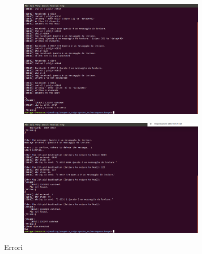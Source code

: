 \begin{figure}
\centering
\begin{subfigure}[b]{0.8\textwidth}
\includegraphics[width=\textwidth]{screenmsg/16_server}
\caption{}
\end{subfigure}
\begin{subfigure}[b]{0.8\textwidth}
\includegraphics[width=\textwidth]{screenmsg/17_client_6932}
\caption{}
\end{subfigure}
\caption{Errori}
\end{figure}
